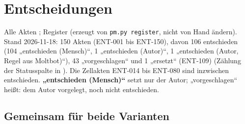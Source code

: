 \documentclass[10pt,a4paper]{article}
\begin{document}
\section{Entscheidungen}
Alle Akten ; Register  (erzeugt von \texttt{pm.py register}, nicht von Hand ändern). Stand 2026-11-18: 150 Akten (ENT-001 bis ENT-150), davon 106 entschieden (104 „entschieden (Mensch)“, 1 „entschieden (Autor)“, 1 „entschieden (Autor, Regel aus Moltbot)“), 43 „vorgeschlagen“ und 1 „ersetzt“ (ENT-109) (Zählung der Statusspalte in ). Die Zellakten ENT-014 bis ENT-080 sind inzwischen entschieden.
\textbf{„entschieden (Mensch)“} setzt nur der Autor; „vorgeschlagen“ heißt: dem Autor vorgelegt, noch nicht entschieden.

\subsection*{Gemeinsam für beide Varianten}
\end{document}
